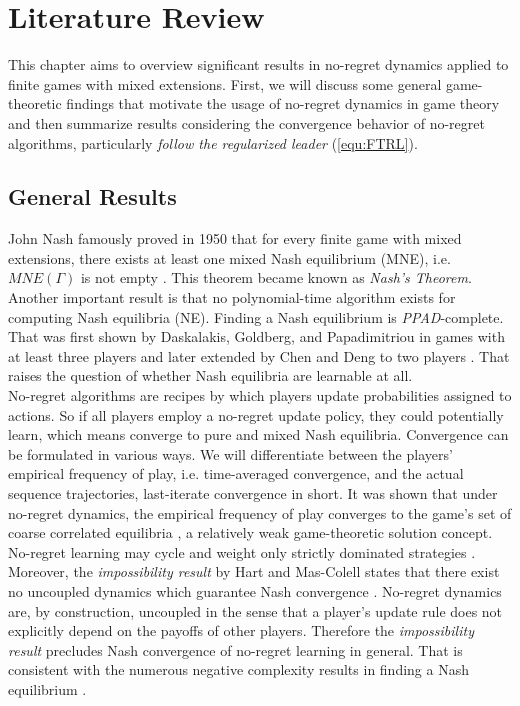 
\chapter{Literature Review}\label{chapter:literatureReview}

This chapter aims to overview significant results in no-regret dynamics applied to finite games with mixed extensions. First, we will discuss some general game-theoretic findings that motivate the usage of no-regret dynamics in game theory and then summarize results considering the convergence behavior of no-regret algorithms, particularly \textit{follow the regularized leader} (\ref{equ:FTRL}). \\

\section{General Results}\label{section:generalResults}

John Nash famously proved in 1950 that for every finite game with mixed extensions, there exists at least one mixed Nash equilibrium (MNE), i.e. $MNE(\Gamma)$ is not empty \cite{nash}. This theorem became known as \textit{Nash's Theorem}. Another important result is that no polynomial-time algorithm exists for computing Nash equilibria (NE). Finding a Nash equilibrium is \textit{PPAD}-complete. That was first shown by Daskalakis, Goldberg, and Papadimitriou in games with at least three players \cite{daskalakis} and later extended by Chen and Deng to two players \cite{chen}. That raises the question of whether Nash equilibria are learnable at all. \\

No-regret algorithms are recipes by which players update probabilities assigned to actions. So if all players employ a no-regret update policy, they could potentially learn, which means converge to pure and mixed Nash equilibria. Convergence can be formulated in various ways. We will differentiate between the players' empirical frequency of play, i.e. time-averaged convergence, and the actual sequence trajectories, last-iterate convergence in short. It was shown that under no-regret dynamics, the empirical frequency of play converges to the game's set of coarse correlated equilibria \cite{flokas}, a relatively weak game-theoretic solution concept. No-regret learning may cycle and weight only strictly dominated strategies \cite{mertikopoulos}. Moreover, the \textit{impossibility result} by Hart and Mas-Colell states that there exist no uncoupled dynamics which guarantee Nash convergence \cite{hart}. No-regret dynamics are, by construction, uncoupled in the sense that a player’s update rule does not explicitly depend on the payoffs of other players. Therefore the \textit{impossibility result} precludes Nash convergence of no-regret learning in general. That is consistent with the numerous negative complexity results in finding a Nash equilibrium \cite{chen, daskalakis}. 


